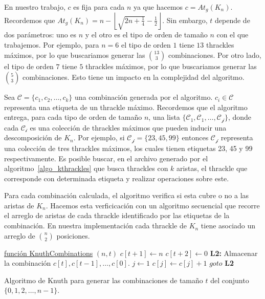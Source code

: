   En nuestro trabajo, $c$ es fija para cada $n$ ya que hacemos $c = At_g(K_n)$.
  Recordemos que $At_g(K_n) = n - \left\lfloor\sqrt{2n+\frac{1}{4}} -
  \frac{1}{2}\right\rfloor$. Sin embargo, $t$ depende de dos parámetros: uno es $n$ y el
  otro es el tipo de orden de tamaño $n$ con el que trabajemos. Por ejemplo, para $n=6$
  el tipo de orden $1$ tiene $13$ thrackles máximos, por lo que buscariamos generar las
  $\binom{13}{3}$ combinaciones. Por otro lado, el tipo de orden $7$ tiene $5$ thrackles
  máximos, por lo que buscariamos generar las $\binom{5}{3}$ combinaciones. Esto tiene un
  impacto en la complejidad del algoritmo.

  Sea $\mathcal{C}=\{c_1,c_2,\dots,c_k\}$ una combinación generada por el algoritmo.
  $c_i\in\mathcal{C}$ representa una etiqueta de un thrackle máximo. Recordemos que el
  algoritmo entrega, para cada tipo de orden de tamaño $n$, una lista
  $\{\mathcal{C_1},\mathcal{C_1},\dots,\mathcal{C_j}\}$, donde cada $\mathcal{C_i}$ es
  una colección de thrackles máximos que pueden inducir una descomposición de $K_n$. Por
  ejemplo, si $\mathcal{C_j}=\{23,45,99\}$ entonces $\mathcal{C_j}$ representa una
  colección de tres thrackles máximos, los cuales tienen etiquetas 23, 45 y 99
  respectivamente. Es posible buscar, en el archivo generado por el
  algoritmo~\ref{algo_kthrackles} que busca thrackles con $k$ aristas, el thrackle que
  corresponde con determinada etiqueta y realizar operaciones sobre este.

  Para cada combinación calculada, el algoritmo verifica si esta cubre o no a las aristas
  de $K_n$. Hacemos esta verficicación con un algoritmo secuencial que recorre el arreglo
  de aristas de cada thrackle identificado por las etiquetas de la combinación. En
  nuestra implementación cada thrackle de $K_n$ tiene asociado un arreglo de
  $\binom{n}{2}$ posiciones.
  \begin{algorithm}[h]
    \DontPrintSemicolon
    \underline{función KnuthCombinations} $(n,t)$\;
    $c[t+1] \gets n$\;
    $c[t+2] \gets 0$\;
    \textbf{L2: } \;
    Almacenar la combinación $c[t],c[t-1],\dots,c[0]$. \;
    $j \gets 1$ \;
    $c[j] \gets c[j]+1$ \;
    $goto$\textbf{ L2}\;
    \caption{Algoritmo de Knuth para generar las combinaciones de tamaño $t$ del conjunto $\{0,1,2,\dots,n-1\}$.}
    \label{algo:knuth_combinaciones}
  \end{algorithm}


